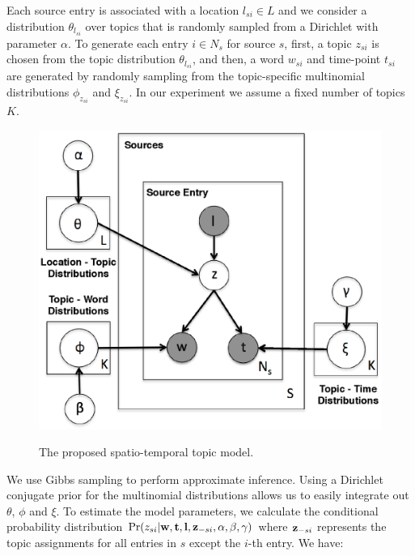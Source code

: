 \documentclass[twoside,leqno,twocolumn]{article}
\begin{document}
Each source entry is associated with a location $l_{si} \in L$ and we consider a distribution $\theta_{l_{si}}$ over topics that is randomly sampled from a Dirichlet with parameter $\alpha$. To generate each entry $i \in N_s$ for source $s$, first, a topic $z_{si}$ is chosen from the topic distribution $\theta_{l_{si}}$, and then, a word $w_{si}$ and time-point $t_{si}$ are generated by randomly sampling from the topic-specific multinomial distributions $\phi_{z_{si}}$ and $\xi_{z_{si}}$.  In our experiment we assume a fixed number of topics $K$.

\begin{figure}[h]
\begin{center}
       \includegraphics[clip, scale=0.5]{fig/stm_model_plus.eps} \label{fig:stm_model}
\end{center}
\caption{The proposed spatio-temporal topic model.}
\label{fig:stm_model}
\end{figure}

We use Gibbs sampling to perform approximate inference. Using a Dirichlet conjugate prior for the multinomial distributions allows us to easily integrate out $\theta$, $\phi$ and $\xi$.  To estimate the model parameters, we calculate the conditional probability distribution $\Pr(z_{si}|{\bf w},{\bf t}, {\bf l}, {\bf z}_{-si}, \alpha, \beta, \gamma)$ where ${\bf z}_{-si}$ represents the topic assignments for all entries in $s$ except the $i$-th entry. We have:
\end{document}
